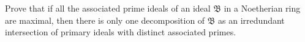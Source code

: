 Prove that if all the associated prime ideals of an ideal $\mathfrak{B}$ in a Noetherian ring are maximal, then there is only one decomposition of $\mathfrak{B}$ as an irredundant intersection of primary ideals with distinct associated primes.

